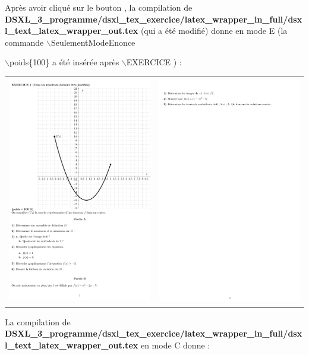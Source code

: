 Après avoir cliqué sur le bouton  , la compilation de \\
{\bf\small DSXL\_3\_programme/dsxl\_tex\_exercice/latex\_wrapper\_in\_full/dsxl\_text\_latex\_wrapper\_out.tex}
(qui a été modifié) donne en mode E (la commande $\backslash$SeulementModeEnonce{ $\backslash$poids\{100\} a été insérée après $\backslash$EXERCICE )  :
 \begin{center}
 \begin{tabular}{cc}
 \includegraphics[width=7cm,height=10cm]{./images/creation_exercice_09.png}
&
 \includegraphics[width=7cm,height=10cm]{./images/creation_exercice_10.png}
\end{tabular}
\end{center}
La compilation de \\
{\bf\small DSXL\_3\_programme/dsxl\_tex\_exercice/latex\_wrapper\_in\_full/dsxl\_text\_latex\_wrapper\_out.tex}
en mode C donne :

}
